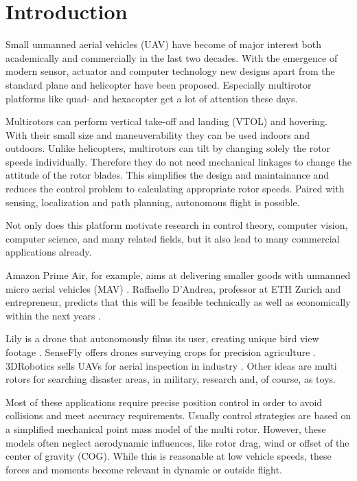 \chapter{Introduction}
\label{sec:introduction}

 Small unmanned aerial vehicles (UAV) have become of major interest both academically and commercially in the last two decades. With the emergence of modern sensor, actuator and computer technology new designs apart from the standard plane and helicopter have been proposed.  Especially multirotor platforms like quad- and hexacopter get a lot of attention these days.

 Multirotors can perform vertical take-off and landing (VTOL) and hovering. With their small size and maneuverability they can be used indoors and outdoors. Unlike helicopters, multirotors can tilt by changing solely the rotor speeds individually. Therefore they do not need mechanical linkages to change the attitude of the rotor blades. This simplifies the design and maintainance and reduces the control problem to calculating appropriate rotor speeds. Paired with sensing, localization and path planning, autonomous flight is possible. 

 Not only does this platform motivate research in control theory, computer vision, computer science, and many related fields, but it also lead to many commercial applications already. 

Amazon Prime Air, for example, aims at delivering smaller goods with unmanned micro aerial vehicles (MAV) \cite{www:primeair}. Raffaello D'Andrea, professor at ETH Zurich and entrepreneur, predicts that this will be feasible technically as well as economically within the next years \cite{DAndrea2014}. 

Lily is a drone that autonomously films its user, creating unique bird view footage \cite{www:lily}. SenseFly offers drones surveying crops for precision agriculture \cite{www:sensefly}. 3DRobotics sells UAVs for aerial inspection in industry \cite{www:3drobotics}. Other ideas are multi rotors for searching disaster areas, in military, research and, of course, as toys.

Most of these applications require precise position control in order to avoid collisions and meet accuracy requirements. Usually control strategies are based on a simplified mechanical point mass model of the multi rotor. However, these models often neglect aerodynamic influences, like rotor drag, wind or offset of the center of gravity (COG). While this is reasonable at low vehicle speeds, these forces and moments become relevant in dynamic or outside flight.

